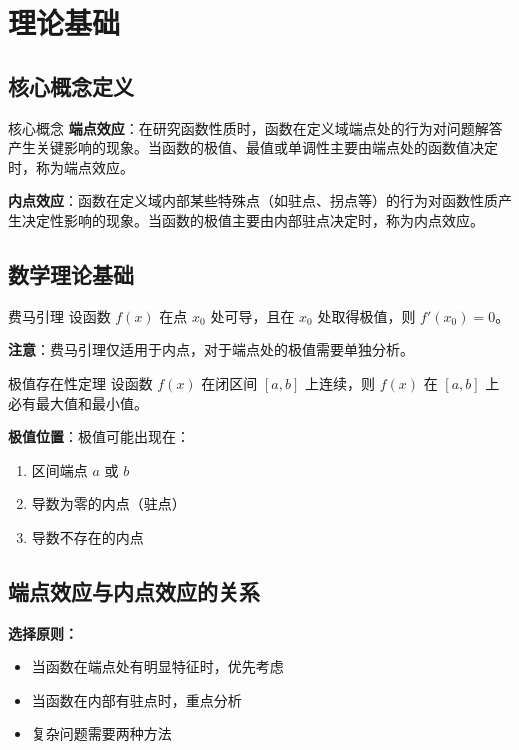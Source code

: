 \documentclass[a4paper,12pt]{ctexrep}
\begin{document}
\chapter{理论基础}

\section{核心概念定义}

\begin{definitionbox}{核心概念}
\textbf{端点效应}：在研究函数性质时，函数在定义域端点处的行为对问题解答产生关键影响的现象。当函数的极值、最值或单调性主要由端点处的函数值决定时，称为端点效应。

\textbf{内点效应}：函数在定义域内部某些特殊点（如驻点、拐点等）的行为对函数性质产生决定性影响的现象。当函数的极值主要由内部驻点决定时，称为内点效应。
\end{definitionbox}

\section{数学理论基础}

\begin{theorembox}{费马引理}
设函数 $f(x)$ 在点 $x_0$ 处可导，且在 $x_0$ 处取得极值，则 $f'(x_0) = 0$。

\textbf{注意}：费马引理仅适用于内点，对于端点处的极值需要单独分析。
\end{theorembox}

\begin{theorembox}{极值存在性定理}
设函数 $f(x)$ 在闭区间 $[a,b]$ 上连续，则 $f(x)$ 在 $[a,b]$ 上必有最大值和最小值。

\textbf{极值位置}：极值可能出现在：
\begin{enumerate}
    \item 区间端点 $a$ 或 $b$
    \item 导数为零的内点（驻点）
    \item 导数不存在的内点
\end{enumerate}
\end{theorembox}

\section{端点效应与内点效应的关系}

\textbf{选择原则：}
\begin{itemize}
    \item 当函数在端点处有明显特征时，优先考虑
    \item 当函数在内部有驻点时，重点分析
    \item 复杂问题需要两种方法
\end{itemize}
\end{document}
